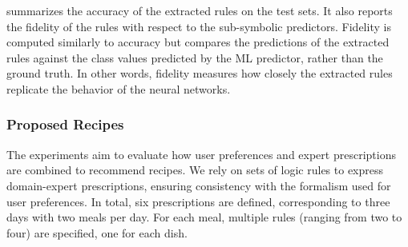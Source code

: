  summarizes the accuracy of the extracted rules on the test sets.
%
It also reports the fidelity of the rules with respect to the sub-symbolic predictors.
%
Fidelity is computed similarly to accuracy but compares the predictions of the extracted rules against the class values predicted by the \gls{ML} predictor, rather than the ground truth.
%
In other words, fidelity measures how closely the extracted rules replicate the behavior of the neural networks.


\subsubsection{Proposed Recipes}\label{subsubsec:proposed-recipes}
%

%

%
The experiments aim to evaluate how user preferences and expert prescriptions are combined to recommend recipes.
%
We rely on sets of logic rules to express domain-expert prescriptions, ensuring consistency with the formalism used for user preferences.
%
In total, six prescriptions are defined, corresponding to three days with two meals per day.
%
For each meal, multiple rules (ranging from two to four) are specified, one for each dish.

